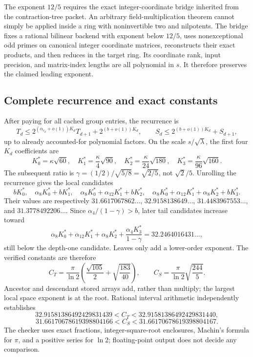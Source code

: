 The exponent $12/5$ requires the exact integer-coordinate bridge inherited
from the contraction-tree packet. An arbitrary field-multiplication theorem
cannot simply be applied inside a ring with noninvertible two and nilpotents.
The bridge fixes a rational bilinear backend with exponent below $12/5$,
uses nonexceptional odd primes on canonical integer coordinate matrices,
reconstructs their exact products, and then reduces in the target ring.
Its coordinate rank, input precision, and matrix-index lengths are all
polynomial in $s$. It therefore preserves the claimed leading exponent.

\subsection{Complete recurrence and exact constants}

After paying for all cached group entries, the recurrence is
\[
 T_d\le 2^{(\alpha_{r_d}+o(1))K_d}T_{d+1}
             +2^{(b+o(1))K_d},
 \qquad S_d\le2^{(b+o(1))K_d}+S_{d+1},
\]
up to already accounted-for polynomial factors. On the scale
$s/\sqrt\lambda$, the first four $K_d$ coefficients are
\[
 K_0^*=\kappa\sqrt{60},\quad
 K_1^*=\frac\kappa4\sqrt{90},\quad
 K_2^*=\frac\kappa{24}\sqrt{180},\quad
 K_3^*=\frac\kappa{96}\sqrt{160}.
\]
The subsequent ratio is
$\gamma=(1/2)/\sqrt{5/8}=\sqrt{2/5}$, not $\sqrt2/5$.
Unrolling the recurrence gives the local candidates
\[
 bK_0^*,\quad \alpha_8K_0^*+bK_1^*,\quad
 \alpha_8K_0^*+\alpha_{12}K_1^*+bK_2^*,\quad
 \alpha_8K_0^*+\alpha_{12}K_1^*+\alpha_8K_2^*+bK_3^*.
\]
Their values are respectively
$31.6617067862\ldots$, $32.9158138649\ldots$,
$31.4483967553\ldots$, and $31.3778492206\ldots$.
Since $\alpha_4/(1-\gamma)>b$, later tail candidates increase toward
\[
 \alpha_8K_0^*+\alpha_{12}K_1^*+\alpha_8K_2^*
       +\frac{\alpha_4K_3^*}{1-\gamma}
 =32.2464016431\ldots,
\]
still below the depth-one candidate. Leaves only add a lower-order
exponent. The verified constants are therefore
\[
 C_T=\frac\pi{\ln2}
       \left(\frac{\sqrt{105}}2+\sqrt{\frac{183}{40}}\right),
 \qquad C_S=\frac\pi{\ln2}\sqrt{\frac{244}{5}}.
\]
Ancestor and descendant stored arrays add, rather than multiply; the
largest local space exponent is at the root. Rational interval arithmetic
independently establishes
\[
 32.91581386492429831439<C_T<32.91581386492429831440,
\]
\[
 31.66170678619398804166<C_S<31.66170678619398804167.
\]
The checker uses exact fractions, integer-square-root enclosures, Machin's
formula for $\pi$, and a positive series for $\ln2$; floating-point output
does not decide any comparison.

